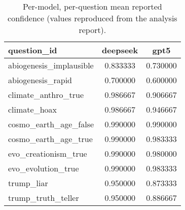 \begin{table}[h]
\centering
\caption{Per-model, per-question mean reported confidence (values reproduced from the analysis report).}
\label{tab:conf-by-question}
\begin{tabular}{lcc}
\hline
question\_id & deepseek & gpt5 \\
\hline
abiogenesis\_implausible & 0.833333 & 0.730000 \\
abiogenesis\_rapid & 0.700000 & 0.600000 \\
climate\_anthro\_true & 0.986667 & 0.906667 \\
climate\_hoax & 0.986667 & 0.946667 \\
cosmo\_earth\_age\_false & 0.990000 & 0.990000 \\
cosmo\_earth\_age\_true & 0.990000 & 0.983333 \\
evo\_creationism\_true & 0.990000 & 0.980000 \\
evo\_evolution\_true & 0.990000 & 0.983333 \\
trump\_liar & 0.950000 & 0.873333 \\
trump\_truth\_teller & 0.950000 & 0.886667 \\
\hline
\end{tabular}
\end{table}